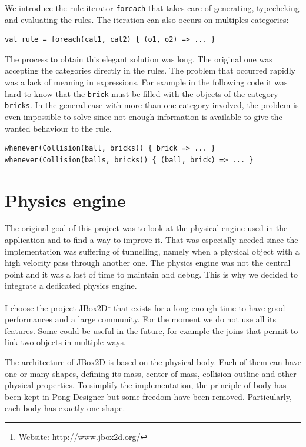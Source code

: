 \documentclass[11pt,a4paper]{article}
\begin{document}
We introduce the rule iterator \texttt{foreach} that takes care of generating, typecheking and evaluating the rules. The iteration can also occurs on multiples categories:

\begin{lstlisting}
val rule = foreach(cat1, cat2) { (o1, o2) => ... }
\end{lstlisting}

The process to obtain this elegant solution was long. The original one was accepting the categories directly in the rules. The problem that occurred rapidly was a lack of meaning in expressions. For example in the following code it was hard to know that the \texttt{brick} must be filled with the objects of the category \texttt{bricks}. In the general case with more than one category involved, the problem is even impossible to solve since not enough information is available to give the wanted behaviour to the rule.
\begin{lstlisting}
whenever(Collision(ball, bricks)) { brick => ... }
whenever(Collision(balls, bricks)) { (ball, brick) => ... }
\end{lstlisting}

\section{Physics engine}
The original goal of this project was to look at the physical engine used in the application and to find a way to improve it. That was especially needed since the implementation was suffering of tunnelling, namely when a physical object with a high velocity pass through another one. The physics engine was not the central point and it was a lost of time to maintain and debug. This is why we decided to integrate a dedicated physics engine. 

I choose the project JBox2D\footnote{Website: \url{http://www.jbox2d.org/}} that exists for a long enough time to have good performances and a large community. For the moment we do not use all its features. Some could be useful in the future, for example the joins that permit to link two objects in multiple ways.

The architecture of JBox2D is based on the physical body. Each of them can have one or many shapes, defining its mass, center of mass, collision outline and other physical properties. To simplify the implementation, the principle of body has been kept in Pong Designer but some freedom have been removed. Particularly, each body has exactly one shape.
\end{document}
